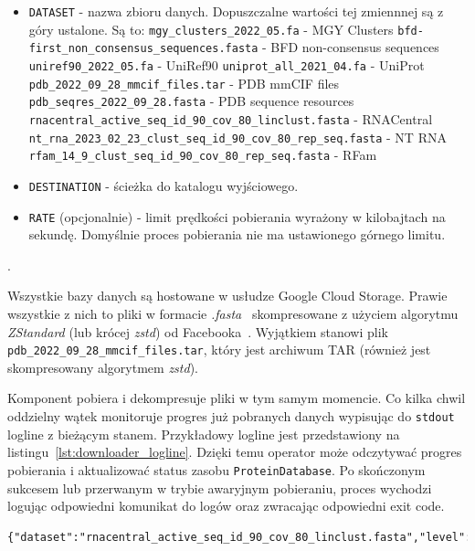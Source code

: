 \begin{itemize}
    \item \texttt{DATASET} - nazwa zbioru danych.
    Dopuszczalne wartości tej zmiennnej są z góry ustalone.
    Są to:
    \subitem \texttt{mgy\_clusters\_2022\_05.fa} - MGY Clusters
    \subitem \texttt{bfd-first\_non\_consensus\_sequences.fasta} - BFD non-consensus sequences
    \subitem \texttt{uniref90\_2022\_05.fa} - UniRef90
    \subitem \texttt{uniprot\_all\_2021\_04.fa} - UniProt
    \subitem \texttt{pdb\_2022\_09\_28\_mmcif\_files.tar} - PDB mmCIF files
    \subitem \texttt{pdb\_seqres\_2022\_09\_28.fasta} - PDB sequence resources
    \subitem \texttt{rnacentral\_active\_seq\_id\_90\_cov\_80\_linclust.fasta} - RNACentral
    \subitem \texttt{nt\_rna\_2023\_02\_23\_clust\_seq\_id\_90\_cov\_80\_rep\_seq.fasta} - NT RNA
    \subitem \texttt{rfam\_14\_9\_clust\_seq\_id\_90\_cov\_80\_rep\_seq.fasta} - RFam
    \item \texttt{DESTINATION} - ścieżka do katalogu wyjściowego.
    \item \texttt{RATE} (opcjonalnie) - limit prędkości pobierania wyrażony w kilobajtach na sekundę.
    Domyślnie proces pobierania nie ma ustawionego górnego limitu.
\end{itemize}.

Wszystkie bazy danych są hostowane w usłudze Google Cloud Storage.
Prawie wszystkie z nich to pliki w formacie \textit{.fasta}~\cite{pearson1988fasta} skompresowane z użyciem algorytmu \textit{ZStandard} (lub krócej \textit{zstd}) od Facebooka~\cite{zstandard}.
Wyjątkiem stanowi plik \texttt{pdb\_2022\_09\_28\_mmcif\_files.tar}, który jest archiwum TAR (również jest skompresowany algorytmem \textit{zstd}).

Komponent pobiera i dekompresuje pliki w tym samym momencie.
Co kilka chwil oddzielny wątek monitoruje progres już pobranych danych wypisując do \texttt{stdout} logline z bieżącym stanem.
Przykładowy logline jest przedstawiony na listingu~\ref{lst:downloader_logline}.
Dzięki temu operator może odczytywać progres pobierania i aktualizować status zasobu \texttt{ProteinDatabase}.
Po skończonym sukcesem lub przerwanym w trybie awaryjnym pobieraniu, proces wychodzi logując odpowiedni komunikat do logów oraz zwracając odpowiedni exit code.

\begin{lstlisting}[language=txt,caption={Sample logline from downloader},label={lst:downloader_logline}]
{"dataset":"rnacentral_active_seq_id_90_cov_80_linclust.fasta","level":"info","msg":"Download progress","size":7700349721,"time":"2025-05-17T16:53:52+02:00","total":13860314914,"type":"download","unit":"bytes"}
\end{lstlisting}

